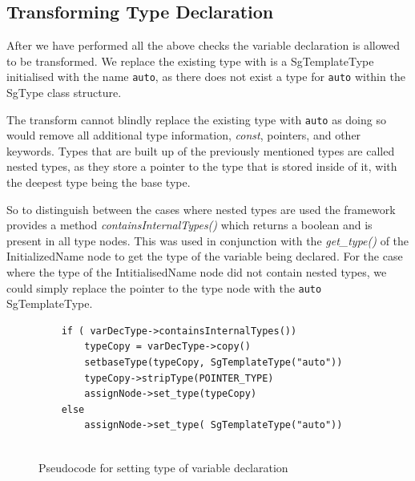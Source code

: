 \documentclass[bsc,frontabs,singlespacing,twoside,parskip,deptreport]{infthesis}
\begin{document}

\subsection{Transforming Type Declaration}
After we have performed all the above checks the variable declaration is allowed to be transformed. We replace the existing type with is a SgTemplateType initialised with the name \texttt{auto}, as there does not exist a type for \texttt{auto} within the SgType class structure. 

The transform cannot blindly replace the existing type with \texttt{auto} as doing so would remove all additional type information, \textit{const}, pointers, and other keywords. Types that are built up of the previously mentioned types are called nested types, as they store a pointer to the type that is stored inside of it, with the deepest type being the base type.

So to distinguish between the cases where nested types are used the framework provides a method \textit{containsInternalTypes()} which returns a boolean and is present in all type nodes. This was used in conjunction with the \textit{get\_type()} of the InitializedName node to get the type of the variable being declared. For the case where the type of the IntitialisedName node did not contain nested types, we could simply replace the pointer to the type node with the \texttt{auto} SgTemplateType. 

\begin{figure}[H]
    \centering
    \begin{verbatim}
    if ( varDecType->containsInternalTypes())
        typeCopy = varDecType->copy()
        setbaseType(typeCopy, SgTemplateType("auto"))
        typeCopy->stripType(POINTER_TYPE)
        assignNode->set_type(typeCopy)
    else
        assignNode->set_type( SgTemplateType("auto"))
    
    \end{verbatim}
    \caption{Pseudocode for setting type of variable declaration}
    \label{fig:auto-cases-nested-types}
\end{figure}
\end{document}

